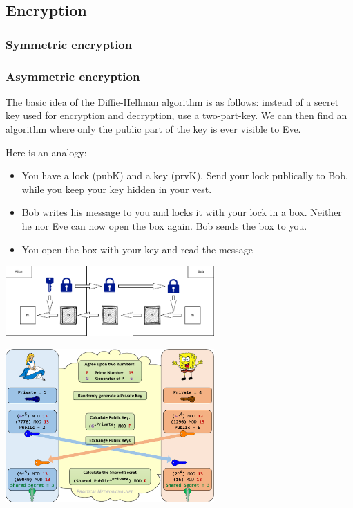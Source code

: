 \subsection{Encryption}

\subsubsection{Symmetric encryption}

\subsubsection{Asymmetric encryption}

The basic idea of the Diffie-Hellman algorithm is as follows: instead of a secret key used for encryption and decryption, use a two-part-key. We can then find an algorithm where only the public part of the key is ever visible to Eve. 

Here is an analogy:
\begin{itemize}
	\item You have a lock (pubK) and a key (prvK). Send your lock publically to Bob, while you keep your key hidden in your vest. 
	\item Bob writes his message to you and locks it with your lock in a box. Neither he nor Eve can now open the box again. Bob sends the box to you.
	\item You open the box with your key and read the message
\end{itemize}

\includegraphics[width=0.6\textwidth]{images/async.png} 

\includegraphics[width=0.6\textwidth]{images/diffie_hellmann} 

